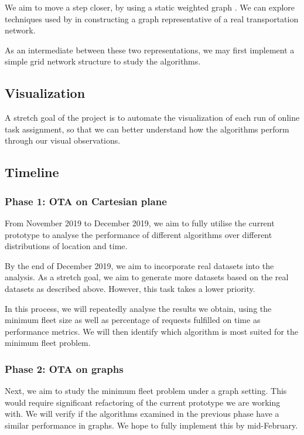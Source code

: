 \documentclass[urop]{nurop}
\begin{document}
We aim to move a step closer, by using a static weighted graph . We can explore techniques used by \cite{nature, preprocess} in constructing a graph representative of a real transportation network.

As an intermediate between these two representations, we may first implement a simple grid network structure to study the algorithms.

\subsection{Visualization}
A stretch goal of the project is to automate the visualization of each run of online task assignment, so that we can better understand how the algorithms perform through our visual observations.

\subsection{Timeline}
\subsubsection{Phase 1: OTA on Cartesian plane}
From November 2019 to December 2019, we aim to fully utilise the current prototype to analyse the performance of different algorithms over different distributions of location and time. 

By the end of December 2019, we aim to incorporate real datasets into the analysis. As a stretch goal, we aim to generate more datasets based on the real datasets as described above. However, this task takes a lower priority.

In this process, we will repeatedly analyse the results we obtain, using the minimum fleet size as well as percentage of requests fulfilled on time as performance metrics. We will then identify which algorithm is most suited for the minimum fleet problem.

\subsubsection{Phase 2: OTA on graphs}
Next, we aim to study the minimum fleet problem under a graph setting. This would require significant refactoring of the current prototype we are working with. We will verify if the algorithms examined in the previous phase have a similar performance in graphs. We hope to fully implement this by mid-February.



\end{document}
